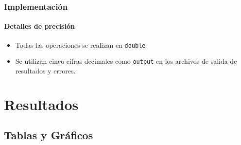 \documentclass[hyperref={pdfpagelayout=SinglePage}]{beamer}
\begin{document}
\begin{frame}
\frametitle{Implementación}
\framesubtitle{Detalles de precisión}
\begin{itemize}
	\item Todas las operaciones se realizan en \texttt{double}
	\item Se utilizan cinco cifras decimales como \texttt{output} en los archivos de salida de resultados y errores.
\end{itemize}
\end{frame}

%

\section{Resultados}

\subsection{Tablas y Gráficos}
\end{document}
